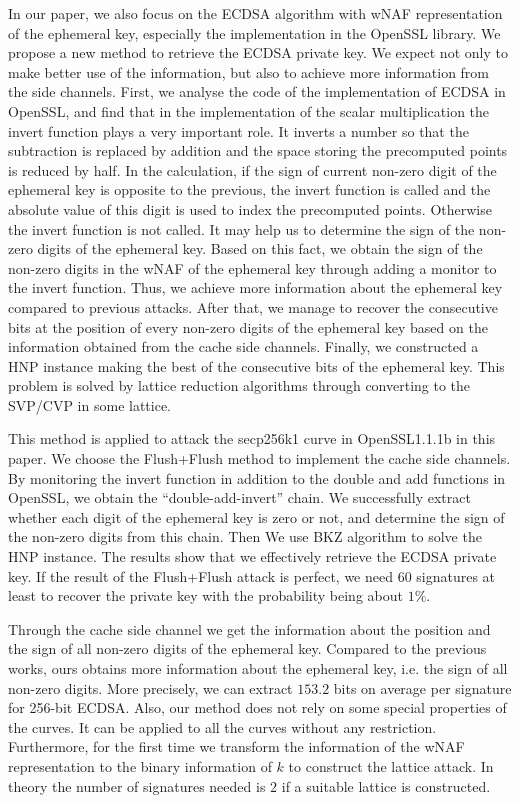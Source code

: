 In our paper, we also focus on the ECDSA algorithm with wNAF representation of the ephemeral key, especially the implementation in the OpenSSL library.
 We propose a new method to retrieve the ECDSA private key.
We expect not only to make better use of the information,
  but also to achieve more information from the side channels.
First, we analyse the code of the implementation of ECDSA in OpenSSL,
 and find that
in the implementation of the scalar multiplication the invert function plays a very important role.
It inverts a number so that the subtraction is replaced by addition and the space storing the precomputed points is reduced by half.
In the calculation, if the sign of current non-zero digit of the ephemeral key is opposite to the previous, the invert function is called  and the absolute value of this digit is used to index the precomputed points. Otherwise the invert function is not called.
It may help us to determine the sign of the non-zero digits of the ephemeral key.
  Based on this fact, we obtain the sign of the non-zero digits in the wNAF of the ephemeral key through adding a monitor to the invert function.
 Thus, we achieve more information about the ephemeral key compared to previous attacks.
After that, we manage to recover the consecutive bits at the position of every non-zero digits of the ephemeral key based on the information obtained from the cache side channels.
Finally, we constructed a HNP \cite{boneh1996} instance making the best of the consecutive bits of the ephemeral key.
This problem is solved by lattice reduction algorithms  through converting to the SVP/CVP in some lattice.

This method is applied to attack the secp256k1 curve in OpenSSL1.1.1b in this paper.
We choose the Flush+Flush\cite{gruss2016flush} method to implement the cache side channels.
By monitoring the  invert function
	in addition to the double and add functions in OpenSSL,
	we obtain the ``double-add-invert'' chain.
We successfully extract whether each digit of the ephemeral key is zero or not, and determine the sign of the non-zero digits from this chain.
Then We use BKZ \cite{Schnorr1994} algorithm to solve the HNP instance.
The results show that we effectively retrieve the ECDSA private key.
If the result of the Flush+Flush attack is perfect, we need $60$ signatures at least to recover the private key with the probability being about $1\%$.

Through the cache side channel we get the information about the position and the sign of all non-zero digits of the ephemeral key.
Compared to the previous works, ours obtains more information about the ephemeral key, i.e. the sign of all non-zero digits.
 More precisely, we can extract $153.2$ bits on average per signature for 256-bit ECDSA.
Also, our method does not rely on some special properties of the curves.
It  can be applied to all the curves without any restriction.
Furthermore,  for the first time we transform the information of the wNAF representation to the binary information of $k$ to construct the lattice attack.
In theory the number of signatures needed is $2$ if a suitable lattice is constructed.




